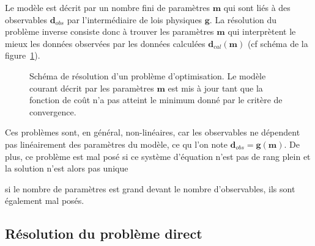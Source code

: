 Le modèle est décrit par un nombre fini de paramètres $\bm{m}$ qui sont liés à des observables $\bm{d}_{obs}$ par l'intermédiaire de lois physiques $\bm{g}$. La résolution du problème inverse consiste donc à trouver les paramètres $\bm{m}$ qui interprètent le mieux les données observées par les données calculées $\bm{d}_{cal}(\bm{m})$ (cf schéma de la figure~\ref{pb_inv}). 

\begin{figure}[!h]
	\centering
	\caption{\label{pb_inv} Schéma de résolution d'un problème d'optimisation. Le modèle courant décrit par les paramètres $\bm{m}$ est mis à jour tant que la fonction de coût n'a pas atteint le minimum donné par le critère de convergence.}
\end{figure}

Ces problèmes sont, en général, non-linéaires, car les observables ne dépendent pas linéairement des paramètres du modèle, ce qu l'on note $\bm{d}_{obs}=\bm{g}(\bm{m})$. De plus, ce problème est mal posé si ce système d'équation n'est pas de rang plein et la solution n'est alors pas unique


 si le nombre de paramètres est grand devant le nombre d'observables, ils sont également mal posés.\\

\subsection{Résolution du problème direct}

